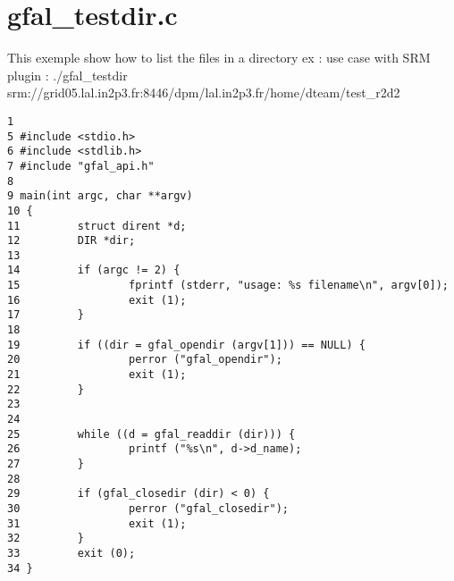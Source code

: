 \section{gfal\_\-testdir.c}
This exemple show how to list the files in a directory ex : use case with SRM plugin : ./gfal\_\-testdir srm://grid05.lal.in2p3.fr:8446/dpm/lal.in2p3.fr/home/dteam/test\_\-r2d2



\begin{DocInclude}\begin{verbatim}1 
5 #include <stdio.h>
6 #include <stdlib.h>
7 #include "gfal_api.h"
8 
9 main(int argc, char **argv)
10 {
11         struct dirent *d;
12         DIR *dir;
13 
14         if (argc != 2) {
15                 fprintf (stderr, "usage: %s filename\n", argv[0]);
16                 exit (1);
17         }
18 
19         if ((dir = gfal_opendir (argv[1])) == NULL) {
20                 perror ("gfal_opendir");
21                 exit (1);
22         }
23 
24 
25         while ((d = gfal_readdir (dir))) {
26                 printf ("%s\n", d->d_name);
27         }
28 
29         if (gfal_closedir (dir) < 0) {
30                 perror ("gfal_closedir");
31                 exit (1);
32         }
33         exit (0);
34 }
\end{verbatim}
\end{DocInclude}
 